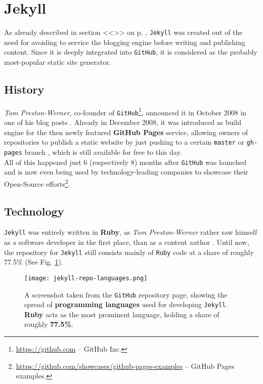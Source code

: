 \section{Jekyll}
\label{sec:jekyll}

As already described in section <<\emph{}>> on p. \pageref{par:creatingcontent}, \texttt{Jekyll} was created out of the need for avoiding to service the blogging engine before writing and publishing content. Since it is deeply integrated into \texttt{GitHub}, it is considered as the probably most-popular static site generator.

\subsection{History}
\label{sec:jekyll-history}
\emph{Tom Preston-Werner}, co-founder of \texttt{GitHub}\footnote{\url{https://github.com} -- GitHub Inc.}, announced it in October 2008 in one of his blog posts \cite{PrestonWerner2008jekyll}. Already in December 2008, it was introduced as build engine for the then newly featured \textbf{GitHub Pages} service, allowing owners of repositories to publish a static website by just pushing to a certain \texttt{master} or \texttt{gh-pages} branch \cite{PrestonWerner2008githubpages}, which is still available for free to this day.\\
All of this happened just 6 (respectively 8) months after \texttt{GitHub} was launched \cite{PrestonWerner2008githublaunch} and is now even being used by technology-leading companies to showcase their Open-Source efforts\footnote{\url{https://github.com/showcases/github-pages-examples} -- GitHub Pages examples.}.

\subsection{Technology}
\label{sec:jekyll-technology}
\texttt{Jekyll} was entirely written in \textbf{Ruby}, as \emph{Tom Preston-Werner} rather saw himself as a software developer in the first place, than as a content author \cite{PrestonWerner2008jekyll}. Until now, the repository for \texttt{Jekyll} still consists mainly of \texttt{Ruby} code at a share of roughly 77.5\% (See Fig. \ref{fig:jekyll-languages}).

\begin{figure}[p]
    \centering
    \texttt{[image: jekyll-repo-languages.png]}
    \caption{A screenshot taken from the \texttt{GitHub} repository page, showing the spread of \textbf{programming languages} used for developing \texttt{Jekyll}. \textbf{Ruby} acts as the most prominent language, holding a share of roughly \textbf{77.5\%}.}
    \label{fig:jekyll-languages}
\end{figure}
%

